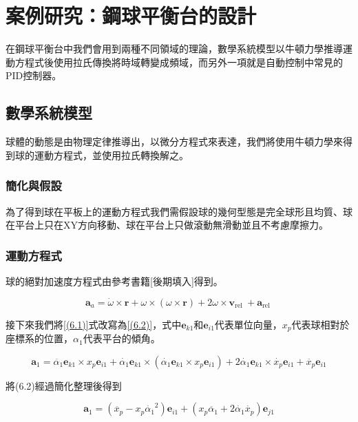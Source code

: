 \chapter{案例研究：鋼球平衡台的設計}
在鋼球平衡台中我們會用到兩種不同領域的理論，數學系統模型以牛頓力學推導運動方程式後使用拉氏傳換將時域轉變成頻域，而另外一項就是自動控制中常見的PID控制器。

\section{數學系統模型}
球體的動態是由物理定律推導出，以微分方程式來表達，我們將使用牛頓力學來得到球的運動方程式，並使用拉氏轉換解之。

\subsection{簡化與假設}
為了得到球在平板上的運動方程式我們需假設球的幾何型態是完全球形且均質、球在平台上只在XY方向移動、球在平台上只做滾動無滑動並且不考慮摩擦力。

\subsection{運動方程式}
球的絕對加速度方程式由參考書籍[後期填入]得到。

\begin{equation}
\mathbf{a}_a=\dot{\omega} \times \mathbf{r}+\omega \times(\omega \times \mathbf{r})+2 \omega \times \mathbf{v}_{\text {rel }}+\mathbf{a}_{\text {rel }}
\label{(6.1)}
\end{equation} 


接下來我們將\ref{(6.1)}式改寫為\ref{(6.2)}，式中\(\mathbf{e}_{k 1}\)和\(\mathbf{e}_{i 1}\)代表單位向量，\(x_p\)代表球相對於座標系的位置，\({\alpha_1}\)代表平台的傾角。

\begin{equation}
\mathbf{a}_1=\ddot{\alpha_1} \mathbf{e}_{k 1} \times x_p \mathbf{e}_{i 1}+\dot{\alpha_1} \mathbf{e}_{k 1} \times\left(\dot{\alpha_1} \mathbf{e}_{k 1} \times x_p \mathbf{e}_{i 1}\right)+2 \dot{\alpha_1} \mathbf{e}_{k 1} \times \dot{x_p} \mathbf{e}_{i 1}+\ddot{x_p} \mathbf{e}_{i 1}
\label{(6.2)}
\end{equation} 



將(6.2)經過簡化整理後得到

\begin{equation}
\mathbf{a}_1= \left( \ddot{x_p} - x_p \dot{\alpha_1}^2 \right) \mathbf{e}_{i 1} + \left( x_p \ddot{\alpha_1} + 2 \dot{\alpha_1} \dot{x_p} \right) \mathbf{e}_{j 1}
\label{(6.3)}
\end{equation}


